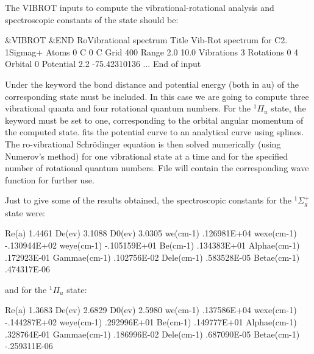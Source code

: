 
The VIBROT inputs to compute the vibrational-rotational
analysis and spectroscopic constants of the state should be:

\begin{inputlisting}
 &VIBROT &END
RoVibrational spectrum
Title
 Vib-Rot spectrum for C2. 1Sigmag+
Atoms
0 C 0 C
Grid
400
Range
2.0 10.0
Vibrations
3
Rotations
0 4
Orbital
0
Potential
2.2 -75.42310136
...
End of input
\end{inputlisting}

Under the keyword  the bond distance and 
potential energy (both in au) of the corresponding state
must be included. In this case we are going to compute three
vibrational quanta and four rotational quantum numbers.
For the $^1\Pi_u$ state, the keyword  must be
set to one, corresponding to the orbital angular momentum
of the computed state.  fits the potential curve to
an analytical curve using splines. The ro-vibrational 
Schr\"odinger equation is then solved numerically (using
Numerov's method) for one vibrational state at a time and
for the specified number of rotational quantum numbers.
File  will contain the corresponding wave 
function for further use.


Just to give some of the results obtained, the spectroscopic
constants for the $^1\Sigma_g^+$ state were:

\begin{sourcelisting}
     Re(a)                 1.4461
     De(ev)                3.1088
     D0(ev)                3.0305
     we(cm-1)         .126981E+04
     wexe(cm-1)      -.130944E+02
     weye(cm-1)      -.105159E+01
     Be(cm-1)         .134383E+01
     Alphae(cm-1)     .172923E-01
     Gammae(cm-1)     .102756E-02
     Dele(cm-1)       .583528E-05
     Betae(cm-1)      .474317E-06
\end{sourcelisting}

and for the $^1\Pi_u$ state:

\begin{sourcelisting}
     Re(a)                 1.3683
     De(ev)                2.6829
     D0(ev)                2.5980
     we(cm-1)         .137586E+04
     wexe(cm-1)      -.144287E+02
     weye(cm-1)       .292996E+01
     Be(cm-1)         .149777E+01
     Alphae(cm-1)     .328764E-01
     Gammae(cm-1)     .186996E-02
     Dele(cm-1)       .687090E-05
     Betae(cm-1)     -.259311E-06
\end{sourcelisting}

